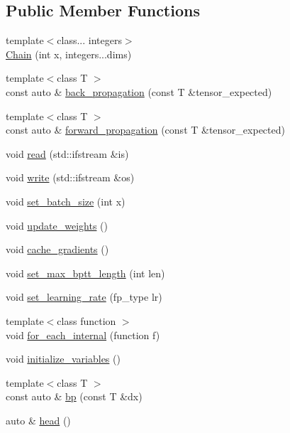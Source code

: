 \subsection*{Public Member Functions}
\begin{DoxyCompactItemize}
\item 
{\footnotesize template$<$class... integers$>$ }\\\hyperlink{structBC_1_1NN_1_1Chain_a07b03d8f2baa7a60bf029fce106aa6d5}{Chain} (int x, integers...\+dims)
\item 
{\footnotesize template$<$class T $>$ }\\const auto \& \hyperlink{structBC_1_1NN_1_1Chain_a0e2d0f62b9c372ffc57b0daee9a3aae1}{back\+\_\+propagation} (const T \&tensor\+\_\+expected)
\item 
{\footnotesize template$<$class T $>$ }\\const auto \& \hyperlink{structBC_1_1NN_1_1Chain_a40b6c171073b5b92e81867762e8bd1a6}{forward\+\_\+propagation} (const T \&tensor\+\_\+expected)
\item 
void \hyperlink{structBC_1_1NN_1_1Chain_a64161fb5c71b1c5f0fa0eeb1a5fcee92}{read} (std\+::ifstream \&is)
\item 
void \hyperlink{structBC_1_1NN_1_1Chain_a450e3960898f066c4a89d36d73cb3cc4}{write} (std\+::ifstream \&os)
\item 
void \hyperlink{structBC_1_1NN_1_1Chain_a02e2d026db3cb1c918895fa58bbce832}{set\+\_\+batch\+\_\+size} (int x)
\item 
void \hyperlink{structBC_1_1NN_1_1Chain_a5849a2e8cd2907345bb9ae03a51b74b5}{update\+\_\+weights} ()
\item 
void \hyperlink{structBC_1_1NN_1_1Chain_a4276120642218b0ad6690d173c067584}{cache\+\_\+gradients} ()
\item 
void \hyperlink{structBC_1_1NN_1_1Chain_af5b0f474e6985900251d89245e8a99fa}{set\+\_\+max\+\_\+bptt\+\_\+length} (int len)
\item 
void \hyperlink{structBC_1_1NN_1_1Chain_a4a2329c35c0576ebe24a966c33042d24}{set\+\_\+learning\+\_\+rate} (fp\+\_\+type lr)
\item 
{\footnotesize template$<$class function $>$ }\\void \hyperlink{structBC_1_1NN_1_1Chain_a79b1be73e16cfd44f6689b47e2af08fa}{for\+\_\+each\+\_\+internal} (function f)
\item 
void \hyperlink{structBC_1_1NN_1_1Chain_a9d69c9bc5baff86fca5f5e231d1f50f6}{initialize\+\_\+variables} ()
\item 
{\footnotesize template$<$class T $>$ }\\const auto \& \hyperlink{structBC_1_1NN_1_1Chain_ad6edc8f2f7a58068817ea40d0d1c7d7c}{bp} (const T \&dx)
\item 
auto \& \hyperlink{structBC_1_1NN_1_1Chain_a1d849218f6fe4c32cafcfb0f53e16cf5}{head} ()
\end{DoxyCompactItemize}
